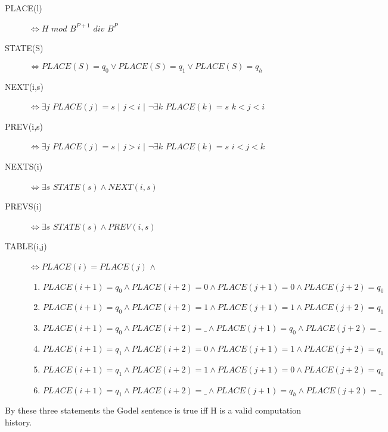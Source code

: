 \documentclass{article}
\begin{document}
\begin{description}
\item[PLACE(l)]$\iff H $ $mod$ $ B^{P+1}$ $div$ $B^P$
\item[STATE(S)]$\iff PLACE(S)=q_0 \lor PLACE(S)=q_1 \lor PLACE(S)=q_h$
\item[NEXT(i,s)]$\iff \exists j $ $PLACE(j)=s $ $|$ $j<i$ $|$ $\neg \exists k$ $PLACE(k)=s $ $k<j<i$
\item[PREV(i,s)]$\iff \exists j $ $PLACE(j)=s $ $|$ $j>i$ $|$ $\neg \exists k$ $PLACE(k)=s $ $i<j<k$
\item[NEXTS(i)]$\iff \exists s $ $STATE(s) \land NEXT(i,s)$
\item[PREVS(i)]$\iff \exists s $ $STATE(s) \land PREV(i,s)$
\item[TABLE(i,j)]$\iff PLACE(i)=PLACE(j) $ $\land $
\begin{enumerate}[label=]
\item $PLACE(i+1) = q_0 \land PLACE(i+2)=0 \land PLACE(j+1)=0 \land PLACE(j+2)=q_0$
\item $PLACE(i+1) = q_0 \land PLACE(i+2)=1 \land PLACE(j+1)=1 \land PLACE(j+2)=q_1$
\item $PLACE(i+1) = q_0 \land PLACE(i+2)=\_ \land PLACE(j+1)=q_0 \land PLACE(j+2)=\_$
\item $PLACE(i+1) = q_1 \land PLACE(i+2)=0 \land PLACE(j+1)=1 \land PLACE(j+2)=q_1$
\item $PLACE(i+1) = q_1 \land PLACE(i+2)=1 \land PLACE(j+1)=0 \land PLACE(j+2)=q_0$
\item $PLACE(i+1) = q_1 \land PLACE(i+2)=\_ \land PLACE(j+1)=q_h \land PLACE(j+2)=\_$
\end{enumerate}
\end{description}

By these three statements the Godel sentence is true iff H is a valid computation history.
\end{document}
